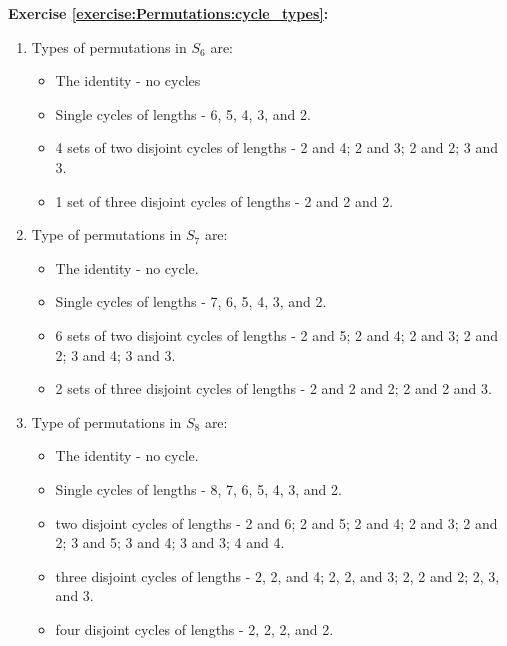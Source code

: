\noindent\textbf{Exercise \ref{exercise:Permutations:cycle_types}:} %
\begin{enumerate}[{a.}]
\item
Types of permutations in $S_6$ are:
	\begin{itemize}
	\item
	The identity - no cycles
	
	\item
	Single cycles of lengths - 6, 5, 4, 3, and 2.
	
	\item
	4 sets of two disjoint cycles of lengths - 2 and 4; 2 and 3; 2 and 2; 3 and 3.
	
	\item
	1 set of three disjoint cycles of lengths - 2 and 2 and 2.
	\end{itemize}
	
\item
Type of permutations in $S_7$ are:
	\begin{itemize}
	\item
	The identity - no cycle.
	
	\item
	Single cycles of lengths - 7, 6, 5, 4, 3, and 2.
	
	\item
	6 sets of two disjoint cycles of lengths - 2 and 5; 2 and 4; 2 and 3; 2 and 2; 3 and 4; 3 and 3.
	
	\item
	2 sets of three disjoint cycles of lengths - 2 and 2 and 2; 2 and 2 and 3.
	\end{itemize}

\item
Type of permutations in $S_8$ are:
	\begin{itemize}
	\item
	The identity - no cycle.
	
	\item
	Single cycles of lengths - 8, 7, 6, 5, 4, 3, and 2.
	
	\item
	two disjoint cycles of lengths - 2 and 6; 2 and 5; 2 and 4; 2 and 3; 2 and 2; 3 and 5; 3 and 4; 3 and 3; 4 and 4.
	
	\item
	three disjoint cycles of lengths - 2, 2, and 4; 2, 2, and 3; 2, 2 and 2; 2, 3, and 3.
	
	\item
	four disjoint cycles of lengths - 2, 2, 2, and 2.
	\end{itemize}
\end{enumerate}


